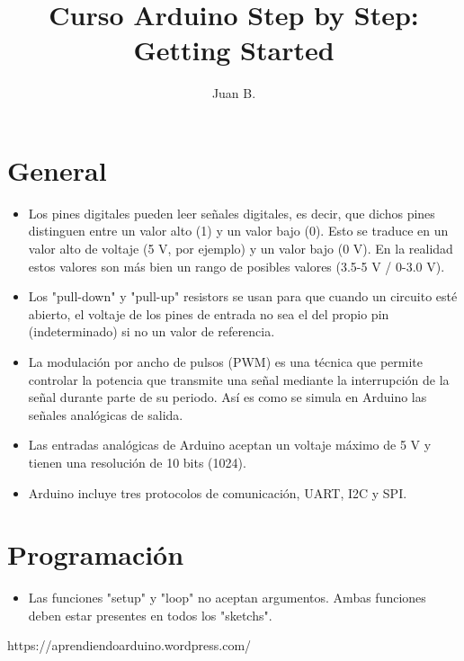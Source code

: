 \documentclass[12pt]{article}
\title{Curso Arduino Step by Step: Getting Started}
\author{Juan B.}
\begin{document}
	\section{General}

	    \begin{itemize}
	        \item Los pines digitales pueden leer señales digitales, es decir, que dichos pines distinguen entre un valor alto (1) y un valor bajo (0). Esto se traduce en un valor alto de voltaje (5 V, por ejemplo) y un valor bajo (0 V). En la realidad estos valores son más bien un rango de posibles valores (3.5-5 V / 0-3.0 V).
	        \item Los "pull-down" y "pull-up" resistors se usan para que cuando un circuito esté abierto, el voltaje de los pines de entrada no sea el del propio pin (indeterminado) si no un valor de referencia.
	        \item La modulación por ancho de pulsos (PWM) es una técnica que permite controlar la potencia que transmite una señal mediante la interrupción de la señal durante parte de su periodo. Así es como se simula en Arduino las señales analógicas de salida.
	        \item Las entradas analógicas de Arduino aceptan un voltaje máximo de 5 V y tienen una resolución de 10 bits (1024).
			\item Arduino incluye tres protocolos de comunicación, UART, I2C y SPI.
	    \end{itemize}

	\section{Programación}
		\begin{itemize}
			\item Las funciones "setup" y "loop" no aceptan argumentos. Ambas funciones deben estar presentes en todos los "sketchs".
		\end{itemize}


    https://aprendiendoarduino.wordpress.com/
\end{document}
